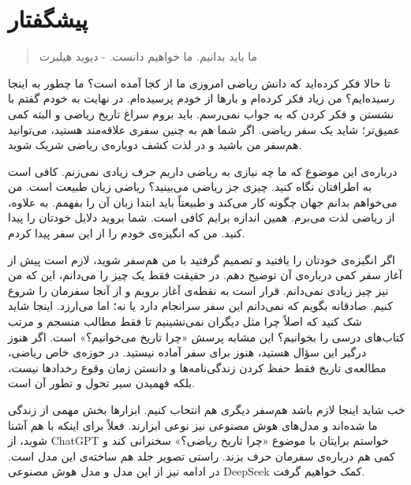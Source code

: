 \chapter{پیشگفتار}
\begin{quote}
	{\lotus
		ما باید بدانیم. ما خواهیم دانست.%
		 - دیوید هیلبرت
	}
\end{quote}
تا حالا فکر کرده‌اید که دانش ریاضی امروزی ما از کجا آمده است؟ ما چطور به اینجا رسیده‌ایم؟ من زیاد فکر کرده‌ام و بارها از خودم پرسیده‌ام. در نهایت به خودم گفتم با نشستن و فکر کردن که به جواب نمی‌رسم. باید بروم سراغ تاریخ ریاضی و البته کمی عمیق‌تر؛ شاید یک سفر ریاضی. اگر شما هم به چنین سفری علاقه‌مند هستید، می‌توانید هم‌سفر من باشید و در لذت کشف دوباره‌ی ریاضی شریک شوید.

درباره‌ی این موضوع که ما چه نیازی به ریاضی داریم حرف زیادی نمی‌زنم. کافی است به اطرافتان نگاه کنید. چیزی جز ریاضی می‌بینید؟ ریاضی زبان طبیعت است. من می‌خواهم بدانم جهان چگونه کار می‌کند و طبیعتاً باید ابتدا زبان آن را بفهمم. به علاوه، از ریاضی لذت می‌برم. همین اندازه برایم کافی است. شما بروید دلایل خودتان را پیدا کنید. من که انگیزه‌ی خودم را از این سفر پیدا کردم.

اگر انگیزه‌ی خودتان را یافتید و تصمیم گرفتید با من هم‌سفر شوید، لازم است پیش از آغاز سفر کمی درباره‌ی آن توضیح دهم. در حقیقت فقط یک چیز را می‌دانم، این که من نیز چیز زیادی نمی‌دانم. قرار است به نقطه‌ی آغاز برویم و از آنجا سفرمان را شروع کنیم. صادقانه بگویم که نمی‌دانم این سفر سرانجام دارد یا نه؛ اما می‌ارزد. اینجا شاید شک کنید که اصلاً چرا مثل دیگران نمی‌نشینیم تا فقط مطالب منسجم و مرتب کتاب‌های درسی را بخوانیم؟ این مشابه پرسش «چرا تاریخ می‌خوانیم؟» است. اگر هنوز درگیر این سؤال هستید، هنوز برای سفر آماده نیستید. در حوزه‌ی خاص ریاضی، مطالعه‌ی تاریخ فقط حفظ کردن زندگی‌نامه‌ها و دانستن زمان وقوع رخدادها نیست، بلکه فهمیدن سیر تحول و تطور آن است.

خب شاید اینجا لازم باشد هم‌سفر دیگری هم انتخاب کنیم. ابزارها بخش مهمی از زندگی ما شده‌اند و مدل‌های هوش مصنوعی نیز نوعی ابزارند. فعلاً برای اینکه با هم آشنا شوید، از ChatGPT خواستم برایتان با موضوع «چرا تاریخ ریاضی؟» سخنرانی کند و کمی هم درباره‌ی سفرمان حرف بزند. راستی تصویر جلد هم ساخته‌ی این مدل است. در ادامه نیز از این مدل و مدل هوش مصنوعی DeepSeek کمک خواهیم گرفت.

